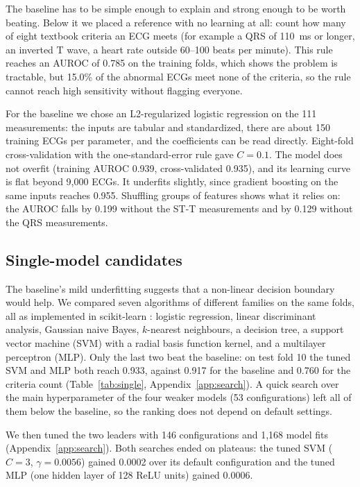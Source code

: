 \documentclass[letterpaper,11pt]{article}
\begin{document}
The baseline has to be simple enough to explain and strong enough to be worth beating. Below it we placed a reference with no learning at all: count how many of eight textbook criteria an ECG meets (for example a QRS of 110~ms or longer, an inverted T wave, a heart rate outside 60--100 beats per minute). This rule reaches an AUROC of 0.785 on the training folds, which shows the problem is tractable, but 15.0\% of the abnormal ECGs meet none of the criteria, so the rule cannot reach high sensitivity without flagging everyone.

For the baseline we chose an L2-regularized logistic regression on the 111 measurements: the inputs are tabular and standardized, there are about 150 training ECGs per parameter, and the coefficients can be read directly. Eight-fold cross-validation with the one-standard-error rule gave $C = 0.1$. The model does not overfit (training AUROC 0.939, cross-validated 0.935), and its learning curve is flat beyond 9,000 ECGs. It underfits slightly, since gradient boosting on the same inputs reaches 0.955. Shuffling groups of features shows what it relies on: the AUROC falls by 0.199 without the ST-T measurements and by 0.129 without the QRS measurements.

\subsection{Single-model candidates}

The baseline's mild underfitting suggests that a non-linear decision boundary would help. We compared seven algorithms of different families on the same folds, all as implemented in scikit-learn \parencite{pedregosa2011scikitlearn}: logistic regression, linear discriminant analysis, Gaussian naive Bayes, $k$-nearest neighbours, a decision tree, a support vector machine (SVM) with a radial basis function kernel, and a multilayer perceptron (MLP). Only the last two beat the baseline: on test fold 10 the tuned SVM and MLP both reach 0.933, against 0.917 for the baseline and 0.760 for the criteria count (Table~\ref{tab:single}, Appendix~\ref{app:search}). A quick search over the main hyperparameter of the four weaker models (53 configurations) left all of them below the baseline, so the ranking does not depend on default settings.

We then tuned the two leaders with 146 configurations and 1,168 model fits (Appendix~\ref{app:search}). Both searches ended on plateaus: the tuned SVM ($C = 3$, $\gamma = 0.0056$) gained 0.0002 over its default configuration and the tuned MLP (one hidden layer of 128 ReLU units) gained 0.0006.
\end{document}
